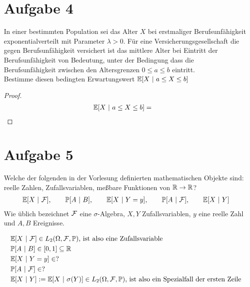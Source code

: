 \documentclass[12pt,a4paper]{article}
\begin{document}
\section*{Aufgabe 4}
In einer bestimmten Population sei das Alter $X$ bei erstmaliger
Berufsunfähigkeit exponentialverteilt mit Parameter $\lambda>0$. Für eine Versicherungsgesellschaft die gegen Berufsunfähigkeit versichert ist das mittlere Alter bei Eintritt der Berufsunfähigkeit von Bedeutung, unter der Bedingung dass die Berufsunfähigkeit zwischen den Altersgrenzen $0\leq a\leq b$ eintritt.\\
Bestimme diesen bedingten Erwartungswert $\mathbb{E}[X~|~a\leq X\leq b]$
\begin{proof}
\begin{align*}
\mathbb{E}[X~|~a\leq X\leq b]&=
\end{align*}
\end{proof}

\section*{Aufgabe 5}
Welche der folgenden in der Vorlesung definierten mathematischen
Objekte sind: reelle Zahlen, Zufallsvariablen, meßbare Funktionen von
$\mathbb{R}\to\mathbb{R}$?
\begin{align*}
\mathbb{E}[X~|~\mathcal{F}],\qquad\mathbb{P}[A~|~B],\qquad \mathbb{E}[X~|~Y=y],\qquad\mathbb{P}[A~|~\mathcal{F}],\qquad\mathbb{E}[X~|~Y]
\end{align*}
Wie üblich bezeichnet $\mathcal{F}$ eine $\sigma$-Algebra, $X,Y$  Zufallsvariablen, $y$ eine reelle Zahl und $A,B$ Ereignisse.
\begin{lösung}
\begin{align*}
&\mathbb{E}[X~|~\mathcal{F}]\in L_2(\Omega,\mathcal{F},\mathbb{P})\text{, ist also eine Zufallsvariable}\\
&\mathbb{P}[A~|~B]\in[0,1]\subseteq\mathbb{R}\\
&\mathbb{E}[X~|~Y=y]\in?\\
&\mathbb{P}[A~|~\mathcal{F}]\in?\\
&\mathbb{E}[X~|~Y]:=\mathbb{E}[X~|~\sigma(Y)]\in L_2(\Omega,\mathcal{F},\mathbb{P})\text{, ist also ein Spezialfall der ersten Zeile}
\end{align*}
\end{lösung}
\end{document}
